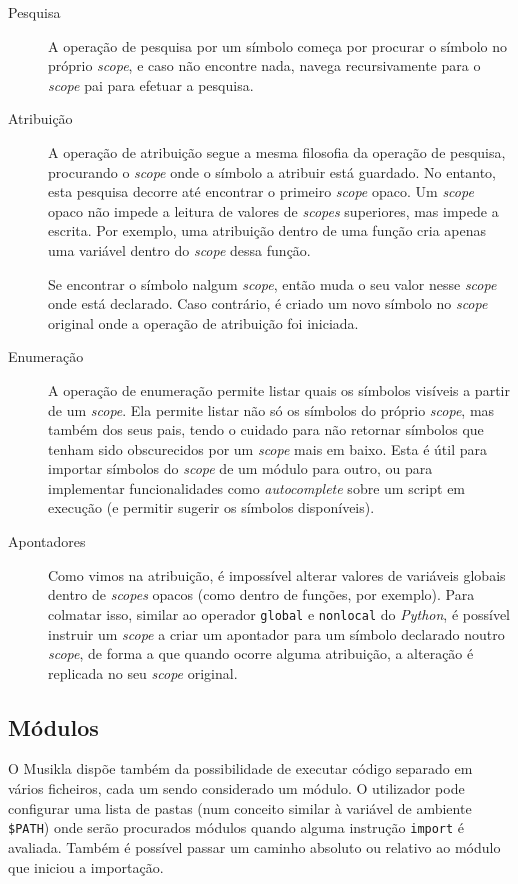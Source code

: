 \begin{description}
 \item[Pesquisa] A operação de pesquisa por um símbolo começa por procurar o símbolo no próprio \textit{scope}, e caso não encontre nada, navega recursivamente para o \textit{scope} pai para efetuar a pesquisa.
 
 \item[Atribuição] A operação de atribuição segue a mesma filosofia da operação de pesquisa, procurando o \textit{scope} onde o símbolo a atribuir está guardado. No entanto, esta pesquisa decorre até encontrar o primeiro \textit{scope} opaco. Um \textit{scope} opaco não impede a leitura de valores de \textit{scopes} superiores, mas impede a escrita. Por exemplo, uma atribuição dentro de uma função cria apenas uma variável dentro do \textit{scope} dessa função.
 
 Se encontrar o símbolo nalgum \textit{scope}, então muda o seu valor nesse \textit{scope} onde está declarado. Caso contrário, é criado um novo símbolo no \textit{scope} original onde a operação de atribuição foi iniciada.
 
 \item[Enumeração] A operação de enumeração permite listar quais os símbolos visíveis a partir de um \textit{scope}. Ela permite listar não só os símbolos do próprio \textit{scope}, mas também dos seus pais, tendo o cuidado para não retornar símbolos que tenham sido obscurecidos por um \textit{scope} mais em baixo. Esta é útil para importar símbolos do \textit{scope} de um módulo para outro, ou para implementar funcionalidades como \textit{autocomplete} sobre um script em execução (e permitir sugerir os símbolos disponíveis).
 
 \item[Apontadores] Como vimos na atribuição, é impossível alterar valores de variáveis globais dentro de \textit{scopes} opacos (como dentro de funções, por exemplo). Para colmatar isso, similar ao operador \texttt{global} e \texttt{nonlocal} do \textit{Python}, é possível instruir um \textit{scope} a criar um apontador para um símbolo declarado noutro \textit{scope}, de forma a que quando ocorre alguma atribuição, a alteração é replicada no seu \textit{scope} original.
\end{description}

\subsection{Módulos}
O Musikla dispõe também da possibilidade de executar código separado em vários ficheiros, cada um sendo considerado um módulo. O utilizador pode configurar uma lista de pastas (num conceito similar à variável de ambiente \texttt{\$PATH}) onde serão procurados módulos quando alguma instrução \texttt{import} é avaliada. Também é possível passar um caminho absoluto ou relativo ao módulo que iniciou a importação.

